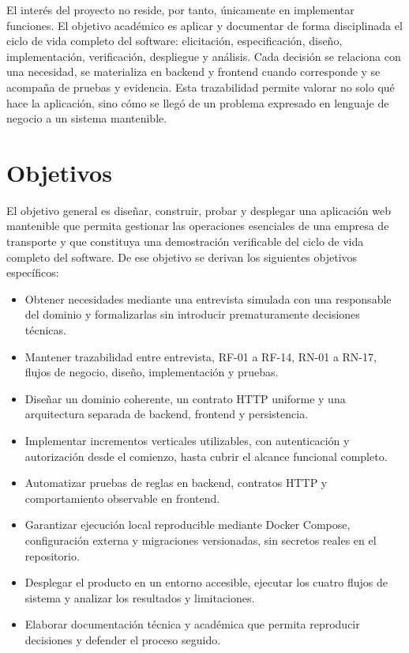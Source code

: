 El interés del proyecto no reside, por tanto, únicamente en implementar funciones. El objetivo académico es aplicar y documentar de forma disciplinada el ciclo de vida completo del software: elicitación, especificación, diseño, implementación, verificación, despliegue y análisis. Cada decisión se relaciona con una necesidad, se materializa en backend y frontend cuando corresponde y se acompaña de pruebas y evidencia. Esta trazabilidad permite valorar no solo qué hace la aplicación, sino cómo se llegó de un problema expresado en lenguaje de negocio a un sistema mantenible.

\section{Objetivos}

El objetivo general es diseñar, construir, probar y desplegar una aplicación web mantenible que permita gestionar las operaciones esenciales de una empresa de transporte y que constituya una demostración verificable del ciclo de vida completo del software. De ese objetivo se derivan los siguientes objetivos específicos:

\begin{itemize}
  \item Obtener necesidades mediante una entrevista simulada con una responsable del dominio y formalizarlas sin introducir prematuramente decisiones técnicas.
  \item Mantener trazabilidad entre entrevista, RF-01 a RF-14, RN-01 a RN-17, flujos de negocio, diseño, implementación y pruebas.
  \item Diseñar un dominio coherente, un contrato HTTP uniforme y una arquitectura separada de backend, frontend y persistencia.
  \item Implementar incrementos verticales utilizables, con autenticación y autorización desde el comienzo, hasta cubrir el alcance funcional completo.
  \item Automatizar pruebas de reglas en backend, contratos HTTP y comportamiento observable en frontend.
  \item Garantizar ejecución local reproducible mediante Docker Compose, configuración externa y migraciones versionadas, sin secretos reales en el repositorio.
  \item Desplegar el producto en un entorno accesible, ejecutar los cuatro flujos de sistema y analizar los resultados y limitaciones.
  \item Elaborar documentación técnica y académica que permita reproducir decisiones y defender el proceso seguido.
\end{itemize}

